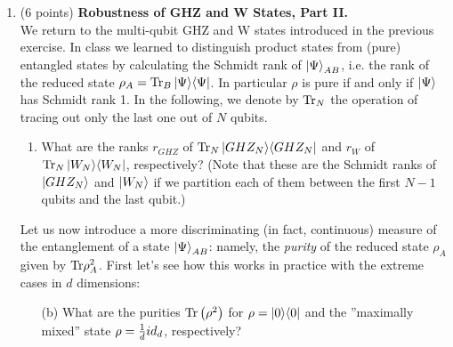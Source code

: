 \documentclass[12pt]{article}
\begin{document}
\begin{enumerate}
\item {(6 points)} {\bf Robustness of GHZ and W States, Part II.}\\
We return to the multi-qubit GHZ and W states introduced in the previous exercise. 
In class we learned to distinguish product states from (pure) entangled states by calculating the Schmidt rank of $\ket{\Psi}_{AB}$, i.e. the rank of the reduced state $\rho_A=\mathrm{Tr}_B \ket{\Psi}\!\bra{\Psi}$. In particular $\rho$ is pure if and only if $\ket{\Psi}$ has Schmidt rank 1. In the following, we denote by $\mathrm{Tr}_N$ the operation of tracing out only the last one out of $N$ qubits.
\begin{enumerate}
\item What are the ranks $r_{GHZ}$ of $\mathrm{Tr}_N \ket{GHZ_N}\!\bra{GHZ_N}$ and $r_W$ of $\mathrm{Tr}_N \ket{W_N}\!\bra{W_N}$, respectively? (Note that these are the Schmidt ranks of $\ket{GHZ_N}$ and $\ket{W_N}$ if we partition each of them between the first $N-1$ qubits and the last qubit.)
%
\end{enumerate}
 Let us now introduce a more discriminating (in fact, continuous) measure of the entanglement of a state $\ket{\Psi}_{AB}$: namely, the \textit{purity} of the reduced state $\rho_A$ given by $\mathrm{Tr} \rho_A^2 $. First let's see how this works in practice with the extreme cases in $d$ dimensions:
\begin{enumerate}
\item[(b)] What are the purities $\mathrm{Tr} \left(\rho^2\right)$ for $\rho=\ket{0}\!\bra{0}$ and the ''maximally mixed'' state $\rho=\frac{1}{d} id_d$, respectively?

\end{enumerate}
\end{enumerate}
\end{document}
